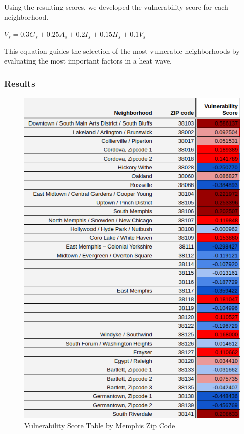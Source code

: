 \documentclass[12pt]{article}
\begin{document}
Using the resulting scores, we developed the vulnerability score for each neighborhood.
\begin{center}
$V_s = 0.3G_s+0.25A_s+0.2I_s+0.15H_s+0.1V_s$
\end{center}

This equation guides the selection of the most vulnerable neighborhoods by evaluating the most important factors in a heat wave.

\subsubsection{Results}
\begin{figure}[H]
\centering
\includegraphics[scale=0.5]{Screenshot from 2025-03-03 21-41-18.png}
\caption{Vulnerability Score Table by Memphis Zip Code}
\end{figure}
\end{document}
